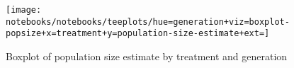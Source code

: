 \begin{figure}
  \centering
  \texttt{[image: notebooks/notebooks/teeplots/hue=generation+viz=boxplot-popsize+x=treatment+y=population-size-estimate+ext=]}
  \caption{Boxplot of population size estimate by treatment and generation}
  \label{fig:ne-estimate-distributions}
\end{figure}

